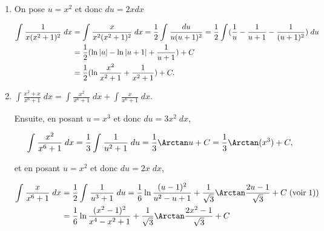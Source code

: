 {{\begin{enumerate}
Maintenant,

$$u^2+1=(\frac{2}{\sqrt{3}}(x+\frac{1}{2}))^2+1=\frac{4}{3}x^2+\frac{4}{3}x+\frac{1}{3}+1=\frac{4}{3}(x^2+x+1).$$

Par suite,

\begin{align*}\ensuremath
\frac{2^8\sqrt{3}}{3^4}\int_{}^{}\frac{1}{(u^2+1)^5}\;du&=\frac{2^8\sqrt{3}}{3^4}
\left(
\frac{1}{8}\frac{3^4}{4^4}\frac{\frac{2}{\sqrt{3}}(x+\frac{1}{2})}{(x^2+x+1)^4}
+\frac{7}{8.6}\frac{3^3}{4^3}\frac{\frac{2}{\sqrt{3}}(x+\frac{1}{2})}{(x^2+x+1)^3}
+\frac{7.5}{8.6.4}\frac{3^2}{4^2}\frac{\frac{2}{\sqrt{3}}(x+\frac{1}{2})}{(x^2+x+1)^2}
\right.
\\
 &\;\left.+\frac{7.5.3}{8.6.4.2}\frac{3}{4}\frac{\frac{2}{\sqrt{3}}(x+\frac{1}{2})}{x^2+x+1}
 +\frac{7.5.3.1}{8.6.4.2}\Arctan\frac{2x+1}{\sqrt{3}}+C
 \right).\\
 &=\frac{1}{8}\frac{2x+1}{(x^2+x+1)^4}+\frac{7}{36}\frac{2x+1}{(x^2+x+1)^3}+\frac{35}{108}\frac{2x+1}{(x^2+x+1)^2}+\frac{35}{54}\frac{2x+1}{x^2+x+1}\\
 &\;+\frac{70\sqrt{3}}{81}\Arctan\frac{2x+1}{\sqrt{3}}+C,
\end{align*}

(il reste encore à réduire au même dénominateur).

\item  On pose $u=x^2$ et donc $du=2xdx$

\begin{align*}\ensuremath
\int_{}^{}\frac{1}{x(x^2+1)^2}\;dx&=\int_{}^{}\frac{x}{x^2(x^2+1)^2}\;dx=\frac{1}{2}\int_{}^{}\frac{du}{u(u+1)^2}
=\frac{1}{2}\int_{}^{}(\frac{1}{u}-\frac{1}{u+1}-\frac{1}{(u+1)^2})\;du\\
 &=\frac{1}{2}(\ln|u|-\ln|u+1|+\frac{1}{u+1})+C\\
 &=\frac{1}{2}(\ln\frac{x^2}{x^2+1}+\frac{1}{x^2+1})+C.
\end{align*}
\item  $\int_{}^{}\frac{x^2+x}{x^6+1}\;dx=\int_{}^{}\frac{x^2}{x^6+1}\;dx+\int_{}^{}\frac{x}{x^6+1}\;dx$.

Ensuite, en posant $u=x^3$ et donc $du=3x^2\;dx$,

$$\int_{}^{}\frac{x^2}{x^6+1}\;dx=\frac{1}{3}\int_{}^{}\frac{1}{u^2+1}\;du=\frac{1}{3}\Arctan u+C=\frac{1}{3}\Arctan(x^3)+C,$$

et en posant $u=x^2$ et donc $du=2x\;dx$,

\begin{align*}\ensuremath
\int_{}^{}\frac{x}{x^6+1}\;dx&=\frac{1}{2}\int_{}^{}\frac{1}{u^3+1}\;du
=\frac{1}{6}\ln\frac{(u-1)^2}{u^2-u+1}+\frac{1}{\sqrt{3}}\Arctan\frac{2u-1}{\sqrt{3}}+C\;(\mbox{voir}\;1))\\
 &=\frac{1}{6}\ln\frac{(x^2-1)^2}{x^4-x^2+1}+\frac{1}{\sqrt{3}}\Arctan\frac{2x^2-1}{\sqrt{3}}+C
\end{align*}


\end{enumerate}}}
